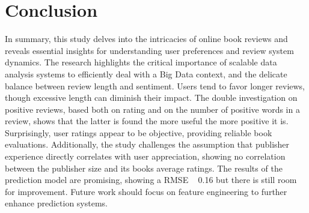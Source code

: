 \section{Conclusion}

In summary, this study delves into the intricacies of online book reviews and reveals essential insights for 
understanding user preferences and review system dynamics. The research highlights the critical importance of 
scalable data analysis systems to efficiently deal with a Big Data context, and the delicate balance between review length and sentiment. Users tend to favor 
longer reviews, though excessive length can diminish their impact. The double investigation on positive reviews, based both on
rating and on the number of positive words in a review, shows that the latter is found the more useful the more positive it is.
 Surprisingly, user ratings 
appear to be objective, providing reliable book evaluations.
Additionally, the study challenges the assumption that publisher experience directly correlates with user 
appreciation, showing no correlation between the publisher size and its books average ratings.
The results of the prediction model are promising, showing a RMSE ~ 0.16 but there is still room for improvement.
Future work should focus on feature engineering to further enhance prediction systems.



